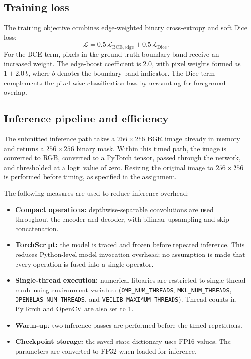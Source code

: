 \documentclass[10pt,a4paper]{article}
\newcommand{\code}[1]{\texttt{\small #1}}
\begin{document}
\subsection{Training loss}

The training objective combines edge-weighted binary cross-entropy and soft Dice loss:
\[
\mathcal{L}
= 0.5\,\mathcal{L}_{\mathrm{BCE,edge}}
+ 0.5\,\mathcal{L}_{\mathrm{Dice}}.
\]
For the BCE term, pixels in the ground-truth boundary band receive an increased weight. The edge-boost coefficient is $2.0$, with pixel weights formed as $1 + 2.0\,b$, where $b$ denotes the boundary-band indicator. The Dice term complements the pixel-wise classification loss by accounting for foreground overlap.

\subsection{Inference pipeline and efficiency}

The submitted inference path takes a $256\times256$ BGR image already in memory and returns a $256\times256$ binary mask. Within this timed path, the image is converted to RGB, converted to a PyTorch tensor, passed through the network, and thresholded at a logit value of zero. Resizing the original image to $256\times256$ is performed before timing, as specified in the assignment.

The following measures are used to reduce inference overhead:
\begin{itemize}
  \item \textbf{Compact operations:} depthwise-separable convolutions are used throughout the encoder and decoder, with bilinear upsampling and skip concatenation.
  \item \textbf{TorchScript:} the model is traced and frozen before repeated inference. This reduces Python-level model invocation overhead; no assumption is made that every operation is fused into a single operator.
  \item \textbf{Single-thread execution:} numerical libraries are restricted to single-thread mode using environment variables (\code{OMP\_NUM\_THREADS}, \code{MKL\_NUM\_THREADS}, \code{OPENBLAS\_NUM\_THREADS}, and \code{VECLIB\_MAXIMUM\_}\allowbreak\code{THREADS}). Thread counts in PyTorch and OpenCV are also set to 1.
  \item \textbf{Warm-up:} two inference passes are performed before the timed repetitions.
  \item \textbf{Checkpoint storage:} the saved state dictionary uses FP16 values. The parameters are converted to FP32 when loaded for inference.
\end{itemize}
\end{document}
